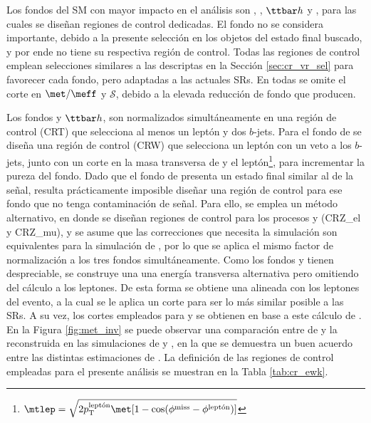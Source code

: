 Los fondos del SM con mayor impacto en el análisis son \wph, \ttbarph, $\ttbar h$ y \znunuph, para las cuales se diseñan regiones de control dedicadas. El fondo \phj no se considera importante, debido a la presente selección en los objetos del estado final buscado, y por ende no tiene su respectiva región de control. Todas las regiones de control emplean selecciones similares a las descriptas en la Sección \ref{sec:cr_vr_sel} para favorecer cada fondo, pero adaptadas a las actuales SRs. En todas se omite el corte en $\met/\meff$ y $\mathcal{S}$, debido a la elevada reducción de fondo que producen.


Los fondos \ttbarph y $\ttbar h$, son normalizados simultáneamente en una región de control (CRT) que selecciona al menos un leptón y dos $b$-jets. Para el fondo de \wph se diseña una región de control (CRW) que selecciona un leptón con un veto a los $b$-jets, junto con un corte en la masa transversa de \met y el leptón\footnote{$\mtlep = \sqrt{2p_{\text{T}}^{\text{leptón}}\met[1-\cos(\phi^{\text{miss}}-\phi^{\text{leptón}})]}$}, para incrementar la pureza del fondo. Dado que el fondo de \znunuph presenta un estado final similar al de la señal, resulta prácticamente imposible diseñar una región de control para ese fondo que no tenga contaminación de señal. Para ello, se emplea un método alternativo, en donde se diseñan regiones de control para los procesos \zeeph y \zmumuph (CRZ\_el y CRZ\_mu), y se asume que las correcciones que necesita la simulación son equivalentes para la simulación de \znunuph, por lo que se aplica el mismo factor de normalización a los tres fondos simultáneamente. Como los fondos \zeeph y \zmumuph tienen \met despreciable, se construye una una energía transversa alternativa pero omitiendo del cálculo a los leptones. De esta forma se obtiene una \met alineada con los leptones del evento, a la cual se le aplica un corte para ser lo más similar posible a las SRs. A su vez, los cortes empleados para \dphijetmet y \dphigammet se obtienen en base a este cálculo de \met. En la Figura \ref{fig:met_inv} se puede observar una comparación entre \met de \znunuph y la reconstruida en las simulaciones de \zeeph y \zmumuph, en la que se demuestra un buen acuerdo entre las distintas estimaciones de \met. La definición de las regiones de control empleadas para el presente análisis se muestran en la Tabla \ref{tab:cr_ewk}.




